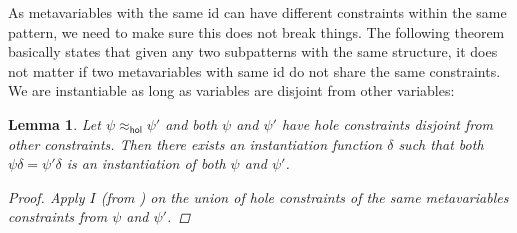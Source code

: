 \documentclass{article}
\numberwithin{deff}{section}
\newtheorem{lemma*}{Lemma}
\numberwithin{lemma*}{section}
\newcommand{\Hol}{\mathsf{hol}}
\begin{document}
As metavariables with the same id can have different constraints within the same pattern, we need to make sure this does not break things.
The following theorem basically states that given any two subpatterns with the same structure, it does not matter if two metavariables with same id do not share the same constraints.
We are instantiable as long as variables are disjoint from other variables:
\begin{lemma*}
  \label{prop:strong_trivial_inst}
  Let $\psi \approx_\Hol \psi'$ and both $\psi$ and $\psi'$ have hole constraints disjoint from other constraints.
  Then there exists an instantiation function $\delta$ such that both $\psi \delta  = \psi' \delta$ is an instantiation of both $\psi$ and $\psi'$.
  \begin{proof}
    Apply $I$ (from ) on the union of hole constraints of the same metavariables constraints from $\psi$ and $\psi'$.
  \end{proof}
\end{lemma*}
\end{document}
